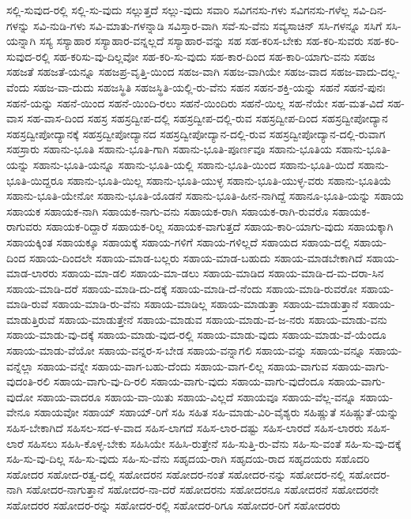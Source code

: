 {ಸಲ್ಲಿ-ಸುವುದ-ರಲ್ಲಿ
ಸಲ್ಲಿ-ಸು-ವುದು
ಸಲ್ಲುತ್ತದೆ
ಸಲ್ಲು-ವುದು
ಸವಾರಿ
ಸವಿಗನಸು-ಗಳು
ಸವಿಗನಸು-ಗಳೆಲ್ಲ
ಸವಿ-ದಿನ-ಗಳನ್ನು
ಸವಿ-ನುಡಿ-ಗಳು
ಸವಿ-ಮಾತು-ಗಳನ್ನಾಡಿ
ಸವಿಸ್ತಾರ-ವಾಗಿ
ಸವೆ-ಸು-ವೆನು
ಸವ್ಯಸಾಚಿನ್
ಸಸಿ-ಗಳನ್ನೂ
ಸಸಿಗೆ
ಸಸಿ-ಯನ್ನಾಗಿ
ಸಸ್ಯ
ಸಸ್ಯಾಹಾರ
ಸಸ್ಯಾಹಾರ-ವನ್ನಲ್ಲದೆ
ಸಸ್ಯಾಹಾರ-ವನ್ನು
ಸಹ
ಸಹ-ಕರಿಸ-ಬೇಕು
ಸಹ-ಕರಿ-ಸುವರು
ಸಹ-ಕರಿ-ಸುವುದ-ರಲ್ಲಿ
ಸಹ-ಕರಿಸು-ವು-ದಿಲ್ಲವೋ
ಸಹ-ಕರಿ-ಸು-ವುದು
ಸಹ-ಕಾರ-ದಿಂದ
ಸಹ-ಕಾರಿ-ಯಾಗು-ವನು
ಸಹಜ
ಸಹಜತೆ
ಸಹಜತೆ-ಯನ್ನೂ
ಸಹಜಪ್ರ-ವೃತ್ತಿ-ಯಿಂದ
ಸಹಜ-ವಾಗಿ
ಸಹಜ-ವಾಗಿಯೇ
ಸಹಜ-ವಾದ
ಸಹಜ-ವಾದು-ದಲ್ಲ-ವೆಂದು
ಸಹಜ-ವಾ-ದುದು
ಸಹಜಸ್ಥಿತಿ
ಸಹಜಸ್ಥಿತಿ-ಯಲ್ಲಿ-ರು-ವೆನು
ಸಹನ
ಸಹನ-ಶಕ್ತಿ-ಯನ್ನು
ಸಹನೆ
ಸಹನೆ-ಪುನಃ
ಸಹನೆ-ಯನ್ನು
ಸಹನೆ-ಯಿಂದ
ಸಹನೆ-ಯಿಂದಿ-ರಲು
ಸಹನೆ-ಯಿಂದಿರು
ಸಹನೆ-ಯಿಲ್ಲ
ಸಹ-ನೆಯೇ
ಸಹ-ಮತ-ವಿದೆ
ಸಹ-ವಾಸ
ಸಹ-ವಾಸ-ದಿಂದ
ಸಹಸ್ರ
ಸಹಸ್ರದ್ವೀಪ-ದಲ್ಲಿ
ಸಹಸ್ರದ್ವೀಪ-ದಲ್ಲಿ-ರುವ
ಸಹಸ್ರದ್ವೀಪ-ದಿಂದ
ಸಹಸ್ರದ್ವೀಪೋದ್ಯಾನ
ಸಹಸ್ರದ್ವೀಪೋದ್ಯಾನಕ್ಕೆ
ಸಹಸ್ರದ್ವೀಪೋದ್ಯಾನದ
ಸಹಸ್ರದ್ವೀಪೋದ್ಯಾನ-ದಲ್ಲಿ-ರುವ
ಸಹಸ್ರದ್ವೀಪೋದ್ಯಾನ-ದಲ್ಲಿ-ರುವಾಗ
ಸಹಸ್ರಾರು
ಸಹಾನು-ಭೂತಿ
ಸಹಾನು-ಭೂತಿ-ಗಾಗಿ
ಸಹಾನು-ಭೂತಿ-ಪೂರ್ಣವೂ
ಸಹಾನು-ಭೂತಿಯ
ಸಹಾನು-ಭೂತಿ-ಯನ್ನು
ಸಹಾನು-ಭೂತಿ-ಯನ್ನೂ
ಸಹಾನು-ಭೂತಿ-ಯಲ್ಲಿ
ಸಹಾನು-ಭೂತಿ-ಯಿಂದ
ಸಹಾನು-ಭೂತಿ-ಯಿದೆ
ಸಹಾನು-ಭೂತಿ-ಯಿದ್ದರೂ
ಸಹಾನು-ಭೂತಿ-ಯಿಲ್ಲ
ಸಹಾನು-ಭೂತಿ-ಯುಳ್ಳ
ಸಹಾನು-ಭೂತಿ-ಯುಳ್ಳ-ವರು
ಸಹಾನು-ಭೂತಿಯೆ
ಸಹಾನು-ಭೂತಿ-ಯೇನೋ
ಸಹಾನು-ಭೂತಿ-ಯೊಡನೆ
ಸಹಾನು-ಭೂತಿ-ಹೀನ-ನಾಗಿದ್ದೆ
ಸಹಾನೂ-ಭೂತಿ-ಯನ್ನು
ಸಹಾಯ
ಸಹಾಯಕ
ಸಹಾಯಕ-ನಾಗಿ
ಸಹಾಯಕ-ನಾಗು-ವನು
ಸಹಾಯಕ-ರಾಗಿ
ಸಹಾಯಕ-ರಾಗಿ-ರುವರೊ
ಸಹಾಯಕ-ರಾಗುವರು
ಸಹಾಯಕ-ರಿದ್ದಾರೆ
ಸಹಾಯಕ-ರಿಲ್ಲ
ಸಹಾಯಕ-ವಾಗುತ್ತದೆ
ಸಹಾಯ-ಕಾರಿ-ಯಾಗು-ವುದು
ಸಹಾಯಕ್ಕಾಗಿ
ಸಹಾಯಕ್ಕಿಂತ
ಸಹಾಯಕ್ಕೂ
ಸಹಾಯಕ್ಕೆ
ಸಹಾಯ-ಗಳಿಗೆ
ಸಹಾಯ-ಗಳಿಲ್ಲದೆ
ಸಹಾಯದ
ಸಹಾಯ-ದಲ್ಲಿ
ಸಹಾಯ-ದಿಂದ
ಸಹಾಯ-ದಿಂದಲೇ
ಸಹಾಯ-ಮಾಡ-ಬಲ್ಲರು
ಸಹಾಯ-ಮಾಡ-ಬಹುದು
ಸಹಾಯ-ಮಾಡಬೇಕಾಗಿದೆ
ಸಹಾಯ-ಮಾಡ-ಲಾರರು
ಸಹಾಯ-ಮಾ-ಡಲಿ
ಸಹಾಯ-ಮಾ-ಡಲು
ಸಹಾಯ-ಮಾಡಿದ
ಸಹಾಯ-ಮಾಡಿ-ದ-ಮ-ದರಾ-ಸಿನ
ಸಹಾಯ-ಮಾಡಿ-ದರೆ
ಸಹಾಯ-ಮಾಡಿ-ದು-ದಕ್ಕೆ
ಸಹಾಯ-ಮಾಡಿ-ದೆ-ನೆಂದು
ಸಹಾಯ-ಮಾಡಿ-ರುವರೋ
ಸಹಾಯ-ಮಾಡಿ-ರುವೆ
ಸಹಾಯ-ಮಾಡಿ-ರು-ವೆನು
ಸಹಾಯ-ಮಾಡಿಲ್ಲ
ಸಹಾಯ-ಮಾಡುತ್ತಾ
ಸಹಾಯ-ಮಾಡುತ್ತಾನೆ
ಸಹಾಯ-ಮಾಡುತ್ತಿರುವೆ
ಸಹಾಯ-ಮಾಡುತ್ತೇನೆ
ಸಹಾಯ-ಮಾಡುವ
ಸಹಾಯ-ಮಾಡು-ವ-ಜ-ನರು
ಸಹಾಯ-ಮಾಡು-ವನು
ಸಹಾಯ-ಮಾಡು-ವು-ದಕ್ಕೆ
ಸಹಾಯ-ಮಾಡು-ವುದ-ರಲ್ಲಿ
ಸಹಾಯ-ಮಾಡು-ವುದು
ಸಹಾಯ-ಮಾಡು-ವೆ-ಯೆಂದೂ
ಸಹಾಯ-ಮಾಡು-ವೆಯೋ
ಸಹಾಯ-ವನ್ನರ-ಸ-ಬೇಡ
ಸಹಾಯ-ವನ್ನಾಗಲಿ
ಸಹಾಯ-ವನ್ನು
ಸಹಾಯ-ವನ್ನೂ
ಸಹಾಯ-ವನ್ನೆಲ್ಲಾ
ಸಹಾಯ-ವನ್ನೇ
ಸಹಾಯ-ವಾಗ-ಬಹು-ದೆಂದು
ಸಹಾಯ-ವಾಗ-ಲಿಲ್ಲ
ಸಹಾಯ-ವಾಗುವ
ಸಹಾಯ-ವಾಗು-ವುದಂತಿ-ರಲಿ
ಸಹಾಯ-ವಾಗು-ವು-ದಿ-ರಲಿ
ಸಹಾಯ-ವಾಗು-ವುದು
ಸಹಾಯ-ವಾಗು-ವುದೆಂದೂ
ಸಹಾಯ-ವಾಗು-ವುದೋ
ಸಹಾಯ-ವಾದರೂ
ಸಹಾಯ-ವಾ-ಯಿತು
ಸಹಾಯ-ವಿಲ್ಲದೆ
ಸಹಾಯವೂ
ಸಹಾಯ-ವೆಲ್ಲ-ವನ್ನೂ
ಸಹಾಯ-ವೇನೂ
ಸಹಾಯವೋ
ಸಹಾಯ್
ಸಹಾಯ್-ರಿಗೆ
ಸಹಿ
ಸಹಿತ
ಸಹಿ-ಮಾಡು-ವಿರಿ-ವೈಶ್ಯರು
ಸಹಿಷ್ಣುತೆ
ಸಹಿಷ್ಣುತೆ-ಯನ್ನು
ಸಹಿಸ-ಬೇಕಾಗಿದೆ
ಸಹಿಸಲ-ಸದ-ಳ-ವಾದ
ಸಹಿಸ-ಲಾಗದೆ
ಸಹಿಸ-ಲಾರ-ದಷ್ಟು
ಸಹಿಸ-ಲಾರದೆ
ಸಹಿಸ-ಲಾರರು
ಸಹಿಸ-ಲಾರೆ
ಸಹಿಸಲು
ಸಹಿಸಿ-ಕೊಳ್ಳ-ಬೇಕು
ಸಹಿಸಿಯೇ
ಸಹಿಸಿ-ರುತ್ತೇನೆ
ಸಹಿ-ಸುತ್ತಿ-ರು-ವೆನು
ಸಹಿ-ಸು-ವಂತೆ
ಸಹಿ-ಸು-ವು-ದಕ್ಕೆ
ಸಹಿ-ಸು-ವು-ದಿಲ್ಲ
ಸಹಿ-ಸು-ವುದು
ಸಹಿ-ಸು-ವೆನು
ಸಹೃದಯ-ರಾಗಿ
ಸಹೃದಯ-ರಾದ
ಸಹೃದಯರು
ಸಹೊದರಿ
ಸಹೋದರ
ಸಹೋದ-ರತ್ವ-ದಲ್ಲಿ
ಸಹೋದರನ
ಸಹೋದರ-ನಂತೆ
ಸಹೋದರ-ನನ್ನು
ಸಹೋದರ-ನಲ್ಲಿ
ಸಹೋದರ-ನಾಗಿ
ಸಹೋದರ-ನಾಗುತ್ತಾನೆ
ಸಹೋದರ-ನಾ-ದರೆ
ಸಹೋದರನು
ಸಹೋದರನೂ
ಸಹೋದರನೆ
ಸಹೋದರನೇ
ಸಹೋದರರ
ಸಹೋದರ-ರನ್ನು
ಸಹೋದರ-ರಲ್ಲಿ
ಸಹೋದರ-ರಿಗೂ
ಸಹೋದರ-ರಿಗೆ
ಸಹೋದರರು
}
